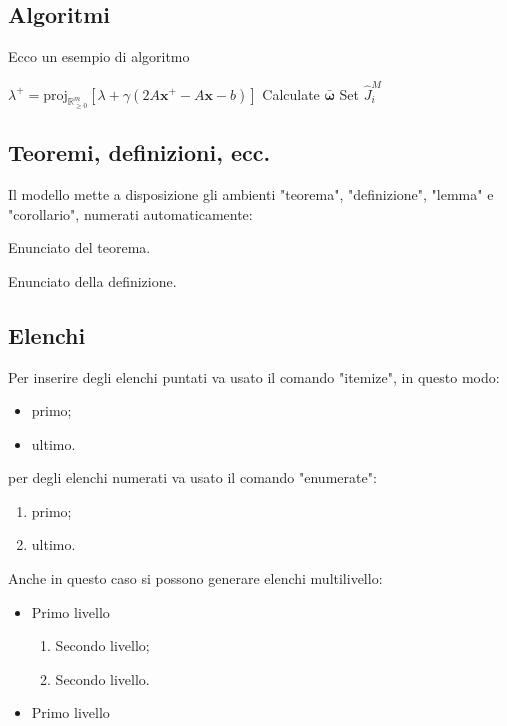 \documentclass{00-settings/document}
\begin{document}
\subsection{Algoritmi}
Ecco un esempio di algoritmo
\begin{algorithm}[h]
\caption{Nome dell'algoritmo}
\begin{algorithmic}
\STATE $\lambda^{+} = \mathrm{proj}_{\mathbb{R}^m_{\geq 0}}\left [ \lambda +\gamma \left (2A\boldsymbol{x}^{+}-A\boldsymbol{x}-b \right ) \right ]$
\STATE Calculate $\boldsymbol{\bar{\omega}}$
\STATE Set $\hat{J}_i^M$ 
\ENDIF
\ENDFOR
\end{algorithmic}
\end{algorithm}

\subsection{Teoremi, definizioni, ecc.}
Il modello mette a disposizione gli ambienti "teorema", "definizione", "lemma" e "corollario", numerati automaticamente:
\begin{teorema}
Enunciato del teorema.
\end{teorema}
\begin{definizione}
Enunciato della definizione.
\end{definizione}

\subsection{Elenchi }
Per inserire degli elenchi puntati va usato il comando "itemize", in questo modo:
\begin{itemize}
\item primo;
\item ultimo.
\end{itemize}
per degli elenchi numerati va usato il comando "enumerate":
\begin{enumerate}
\item primo;
\item ultimo.
\end{enumerate}

Anche in questo caso si possono generare elenchi multilivello:
\begin{itemize}
\item Primo livello
\begin{enumerate}
\item Secondo livello;
\item Secondo livello.
\end{enumerate}
\item Primo livello
\end{itemize}
\end{document}
